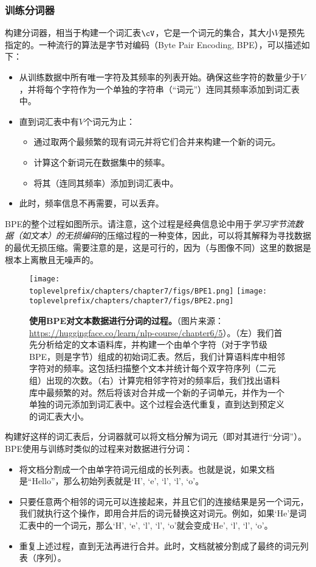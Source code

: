 \documentclass[../../book-main.tex]{subfiles}
\begin{document}
\subsubsection{训练分词器}

构建分词器，相当于构建一个词汇表\(\cV\)，它是一个词元的集合，其大小\(V\)是预先指定的。一种流行的算法是字节对编码（Byte Pair Encoding, BPE），可以描述如下：
\begin{itemize}
    \item 从训练数据中所有唯一字符及其频率的列表开始。确保这些字符的数量少于\(V\)，并将每个字符作为一个单独的字符串（“词元”）连同其频率添加到词汇表中。
    \item 直到词汇表中有\(V\)个词元为止：
    \begin{itemize}
        \item 通过取两个最频繁的现有词元并将它们合并来构建一个新的词元。
        \item 计算这个新词元在数据集中的频率。
        \item 将其（连同其频率）添加到词汇表中。
    \end{itemize} 
    \item 此时，频率信息不再需要，可以丢弃。
\end{itemize}
BPE的整个过程如图所示。请注意，这个过程是经典信息论中用于\textit{学习字节流数据（如文本）的无损编码}的压缩过程的一种变体，因此，可以将其解释为寻找数据的最优无损压缩。需要注意的是，这是可行的，因为（与图像不同）这里的数据是根本上离散且无噪声的。
\begin{figure}
    \centering
    \texttt{[image: \\toplevelprefix/chapters/chapter7/figs/BPE1.png]}\hspace{0.6in} 
    \texttt{[image: \\toplevelprefix/chapters/chapter7/figs/BPE2.png]} 
    \caption{\small {\bf 使用BPE对文本数据进行分词的过程。}（图片来源：\url{https://huggingface.co/learn/nlp-course/chapter6/5}）。（左）我们首先分析给定的文本语料库，并构建一个由单个字符（对于字节级BPE，则是字节）组成的初始词汇表。然后，我们计算语料库中相邻字符对的频率。这包括扫描整个文本并统计每个双字符序列（二元组）出现的次数。（右）计算完相邻字符对的频率后，我们找出语料库中最频繁的对。然后将该对合并成一个新的子词单元，并作为一个单独的词元添加到词汇表中。这个过程会迭代重复，直到达到预定义的词汇表大小。 }
    \label{fig:BPE}
\end{figure}
构建好这样的词汇表后，分词器就可以将文档分解为词元（即对其进行“分词”）。BPE使用与训练时类似的过程来对数据进行分词：
\begin{itemize}
    \item 将文档分割成一个由单字符词元组成的长列表。也就是说，如果文档是“Hello”，那么初始列表就是`H', `e', `l', `l', `o'。
    \item 只要任意两个相邻的词元可以连接起来，并且它们的连接结果是另一个词元，我们就执行这个操作，即用合并后的词元替换这对词元。例如，如果`He'是词汇表中的一个词元，那么`H', `e', `l', `l', `o'就会变成`He', `l', `l', `o'。
    \item 重复上述过程，直到无法再进行合并。此时，文档就被分割成了最终的词元列表（序列）。
\end{itemize}
\end{document}
